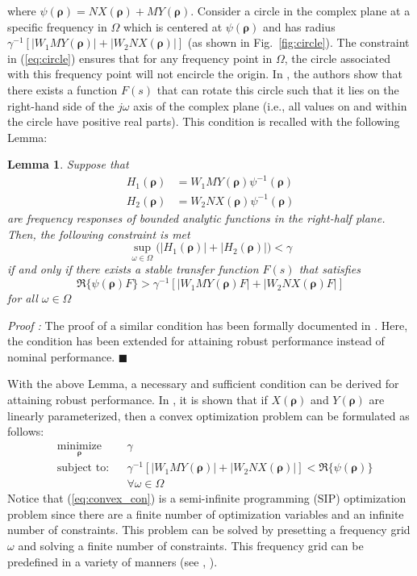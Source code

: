 \documentclass[letterpaper, 10 pt, conference]{ieeeconf}  %
\newtheorem{lemma}{Lemma}
\begin{document}
where $\psi(\bm{\rho}) = NX(\bm{\rho})+MY(\bm{\rho})$. Consider a circle in the complex plane at a specific frequency in $\Omega$ which is centered at $\psi(\bm{\rho})$ and has radius $\gamma^{-1}\left[ |W_1MY(\bm{\rho})| + |W_2 NX(\bm{\rho})| \right]$ (as shown in Fig.~\ref{fig:circle}). The constraint in (\ref{eq:circle}) ensures that for any frequency point in $\Omega$, the circle associated with this frequency point will not encircle the origin. In \cite{KNZ16}, the authors show that there exists a function $F(s)$ that can rotate this circle such that it lies on the right-hand side of the $j\omega$ axis of the complex plane (i.e., all values on and within the circle have positive real parts). This condition is recalled with the following Lemma:

\begin{lemma}   \label{lem1}
Suppose that 
\begin{equation*}
\begin{aligned}
H_1(\bm{\rho}) &=W_1MY(\bm{\rho}) \psi^{-1}(\bm{\rho})\\   H_2(\bm{\rho}) &=W_2NX(\bm{\rho}) \psi^{-1}(\bm{\rho})
\end{aligned}
\end{equation*}
are frequency responses of bounded analytic functions in the right-half plane. Then, the following constraint is met
\begin{equation} \label{eq4}
\sup_{\omega \in \Omega}  \big(|H_1(\bm{\rho}) | + |H_2(\bm{\rho}) | \big) < \gamma
\end{equation}
if and only if there exists a stable transfer function $F(s)$ that satisfies
$$
\Re\{\psi(\bm{\rho})F\}>\gamma^{-1}\left[ |W_1MY(\bm{\rho})F| + |W_2 NX(\bm{\rho})F| \right]
$$
for all $\omega \in \Omega $
\end{lemma}
{\it Proof :} 
The proof of a similar condition has been formally documented in \cite{KNZ16}. Here, the condition has been extended for attaining robust performance instead of nominal performance.
{\hfill \ensuremath{\blacksquare}}

With the above Lemma, a necessary and sufficient condition can be derived for attaining robust performance. In \cite{KNZ16}, it is shown that if $X(\bm{\rho})$ and $Y(\bm{\rho})$ are linearly parameterized, then a convex optimization problem can be formulated as follows: 
\begin{equation} \label{eq:convex_con}
\begin{aligned}
& \underset{ \bm{\rho}}{\text{minimize}}
& & \gamma  \\
& \text{subject to:} & & \gamma^{-1} \left[  |W_1MY(\bm{\rho})| + |W_2 NX(\bm{\rho})| \right] < \Re\{\psi(\bm{\rho}) \}  \\ 
& & & \forall \omega \in \Omega \quad 
\end{aligned}
\end{equation}
Notice that (\ref{eq:convex_con}) is a semi-infinite programming (SIP) optimization problem since there are a finite number of optimization variables and an infinite number of constraints. This problem can be solved by presetting a frequency grid $\omega$ and solving a finite number of constraints. This frequency grid can be predefined in a variety of manners (see \cite{SVBB11}, \cite{GKL10b}).
\end{document}
